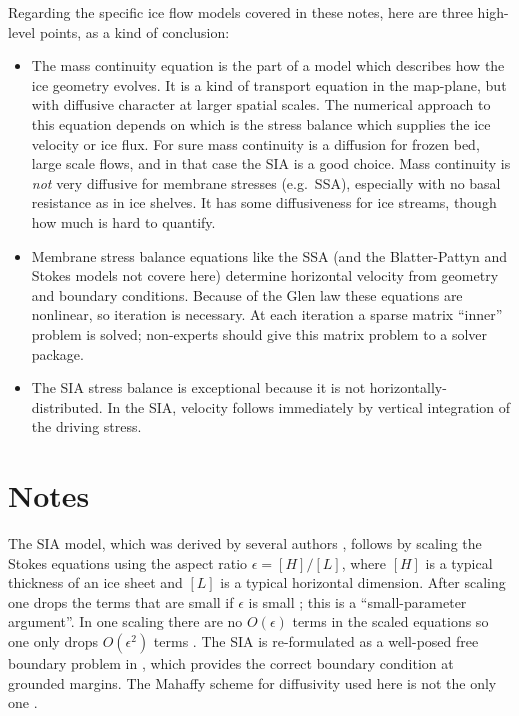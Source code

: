 \documentclass[letterpaper,final,12pt,reqno]{amsart}
\newcommand{\eps}{\epsilon}
\begin{document}
Regarding the specific ice flow models covered in these notes, here are three high-level points, as a kind of conclusion:
\begin{itemize}
\item The mass continuity equation is the part of a model which describes how the ice geometry evolves.  It is a kind of transport equation in the map-plane, but with diffusive character at larger spatial scales.  The numerical approach to this equation depends on which is the stress balance which supplies the ice velocity or ice flux.  For sure mass continuity is a diffusion for frozen bed, large scale flows, and in that case the SIA is a good choice.  Mass continuity is \emph{not} very diffusive for membrane stresses (e.g.~SSA), especially with no basal resistance as in ice shelves.  It has some diffusiveness for ice streams, though how much is hard to quantify.
\item Membrane stress balance equations like the SSA (and the Blatter-Pattyn and Stokes models not covere here) determine horizontal velocity from geometry and boundary conditions.  Because of the Glen law these equations are nonlinear, so iteration is necessary.  At each iteration a sparse matrix ``inner'' problem is solved; non-experts should give this matrix problem to a solver package.
\item The SIA stress balance is exceptional because it is not horizontally-distributed.  In the SIA, velocity follows immediately by vertical integration of the driving stress.
\end{itemize}



\section{Notes} \label{sec:nr}

The SIA model, which was derived by several authors \cite{FowlerLarson1978,Hutter,MorlandJohnson}, follows by scaling the Stokes equations using the aspect ratio $\eps = [H]/[L]$, where $[H]$ is a typical thickness of an ice sheet and $[L]$ is a typical horizontal dimension.  After scaling one drops the terms that are small if $\eps$ is small \cite{Fowler,Hutter}; this is a ``small-parameter argument''.  In one scaling there are no $O(\eps)$ terms in the scaled equations so one only drops $O(\eps^2)$ terms \cite{Fowler}.  The SIA is re-formulated as a well-posed free boundary problem in \cite{JouvetBueler2012}, which provides the correct boundary condition at grounded margins.  The Mahaffy \cite{Mahaffy} scheme for diffusivity used here is not the only one \cite{HindmarshPayne}.
\end{document}
